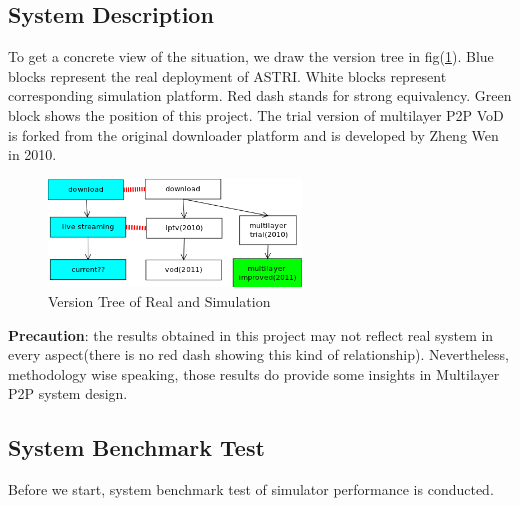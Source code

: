 \documentclass[11pt,a4paper]{article}
\begin{document}
\subsection{System Description}

To get a concrete view of the situation, we draw the 
version tree in fig(\ref{fig:simu_version_tree}). 
Blue blocks represent the real deployment of ASTRI. 
White blocks represent corresponding simulation platform.
Red dash stands for strong equivalency. 
Green block shows the position of this project. 
The trial version of multilayer P2P VoD is forked from the 
original downloader platform and is developed by 
Zheng Wen in 2010. 

\begin{figure}[htb]
	\centering
	\includegraphics[width=0.6\textwidth]{../fig/version_tree.png}
	\caption{Version Tree of Real and Simulation}
	\label{fig:simu_version_tree}
\end{figure}

\textbf{Precaution}: the results obtained in this project may not 
reflect real system in every aspect(there is no red dash showing 
this kind of relationship). Nevertheless, methodology wise speaking, 
those results do provide some insights in Multilayer P2P system design.  




\subsection{System Benchmark Test}

Before we start, system benchmark test of simulator performance
is conducted. 

\end{document}
